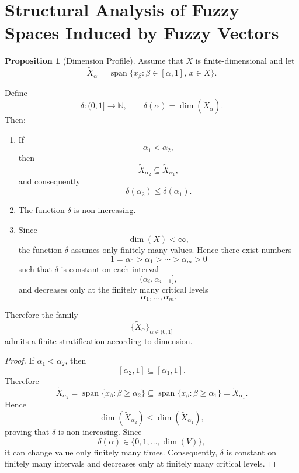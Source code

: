 \documentclass[preprint,12pt]{elsarticle}
\theoremstyle{definition}
\newtheorem{proposition}{Proposition}[section]
\begin{document}
\section{Structural Analysis of Fuzzy Spaces Induced by Fuzzy Vectors}
\begin{proposition}
[Dimension Profile]
	Assume that $X$ is finite-dimensional and let
	\[
	\widetilde X_\alpha
	=
	\operatorname{span}
	\{x_\beta:\beta\in[\alpha,1],\,x\in X\}.
	\]
	
	Define
	\[
	\delta:(0,1]\longrightarrow\mathbb N,
	\qquad
	\delta(\alpha)=\dim(\widetilde X_\alpha).
	\]
	Then:
	
	\begin{enumerate}
		\item
		If
		\[
		\alpha_1<\alpha_2,
		\]
		then
		\[
		\widetilde X_{\alpha_2}
		\subseteq
		\widetilde X_{\alpha_1},
		\]
		and consequently
		\[
		\delta(\alpha_2)
		\le
		\delta(\alpha_1).
		\]
		
		\item
		The function $\delta$ is non-increasing.
		
		\item
		Since
		\[
		\dim(X)<\infty,
		\]
		the function $\delta$ assumes only finitely many values.
		Hence there exist numbers
		\[
		1=\alpha_0>\alpha_1>\cdots>\alpha_m>0
		\]
		such that $\delta$ is constant on each interval
		\[
		(\alpha_i,\alpha_{i-1}],
		\]
		and decreases only at the finitely many critical levels
		\[
		\alpha_1,\ldots,\alpha_m.
		\]
	\end{enumerate}
	Therefore the family
	\[
	\{\widetilde X_\alpha\}_{\alpha\in(0,1]}
	\]
	admits a finite stratification according to dimension.
\end{proposition}
\begin{proof}
	If $\alpha_1<\alpha_2$, then
	\[
	[\alpha_2,1]\subseteq[\alpha_1,1].
	\]
	Therefore
	\[
	\widetilde X_{\alpha_2}
	=
	\operatorname{span}
	\{x_\beta:\beta\ge\alpha_2\}
	\subseteq
	\operatorname{span}
	\{x_\beta:\beta\ge\alpha_1\}
	=
	\widetilde X_{\alpha_1}.
	\]
	Hence
	\[
	\dim(\widetilde X_{\alpha_2})
	\le
	\dim(\widetilde X_{\alpha_1}),
	\]
	proving that $\delta$ is non-increasing.
	Since
	\[
	\delta(\alpha)\in
	\{0,1,\ldots,\dim(V)\},
	\]
	it can change value only finitely many times.
	Consequently, $\delta$ is constant on finitely many intervals and decreases only at finitely many critical levels.
\end{proof}
\end{document}
